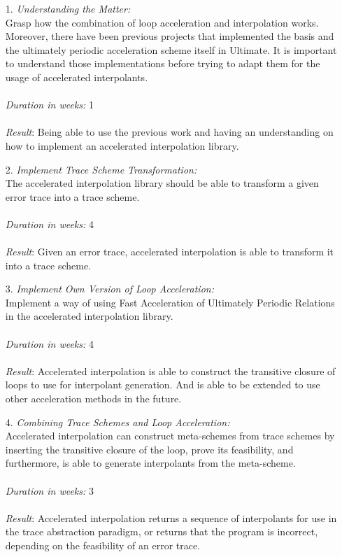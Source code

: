 \documentclass{article}
\begin{document}
\begin{itemize}
	\item[1.] \textsl{Understanding the Matter:} \\
	Grasp how the combination of loop acceleration and interpolation works. \\
	Moreover, there have been previous projects that implemented the basis \cite{ClausThesis} and the ultimately periodic acceleration scheme itself \cite{JillThesis} in Ultimate. It is important to understand those implementations before trying to adapt them for the usage of accelerated interpolants. \\ \\
	\textsl{Duration in weeks:} 1 \\\\
	\textsl{Result}: Being able to use the previous work and having an understanding on how to implement an accelerated interpolation library.
	\item[2.] \textsl{Implement Trace Scheme Transformation:} \\
	The accelerated interpolation library should be able to transform a given error trace into a trace scheme. \\\\
	\textsl{Duration in weeks:} 4 \\\\
	\textsl{Result}: Given an error trace, accelerated interpolation is able to transform it into a trace scheme.
	
	\item[3.] \textsl{Implement Own Version of Loop Acceleration:} \\
	Implement a way of using Fast Acceleration of Ultimately Periodic Relations in the accelerated interpolation library. \\ \\
	\textsl{Duration in weeks:} 4 \\ \\
	\textsl{Result}: Accelerated interpolation is able to construct the transitive closure of loops to use for interpolant generation. And is able to be extended to use other acceleration methods in the future.
	
	\item[4.] \textsl{Combining Trace Schemes and Loop Acceleration:} \\
	Accelerated interpolation can construct meta-schemes from trace schemes by inserting the transitive closure of the loop, prove its feasibility, and furthermore, is able to generate interpolants from the meta-scheme. \\ \\
	\textsl{Duration in weeks:} 3 \\\\
	\textsl{Result}: Accelerated interpolation returns a sequence of interpolants for use in the trace abstraction paradigm, or returns that the program is incorrect, depending on the feasibility of an error trace.
	

\end{itemize}
\end{document}
